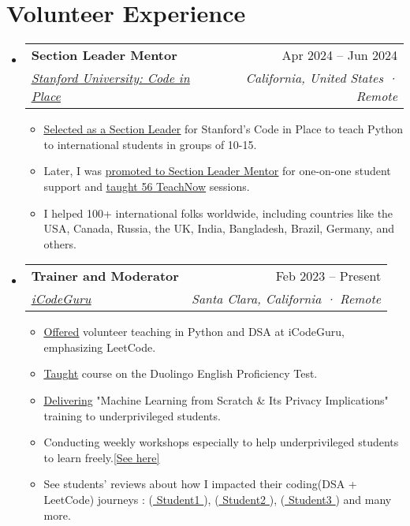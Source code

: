 \documentclass[letterpaper,11pt]{article}
\makeatletter
\newcommand{\resumeItem}[1]{
  \item\small{
    {#1 \vspace{-2pt}}
  }
}
\newcommand{\resumeSubheading}[4]{
  \vspace{-2pt}\item
    \begin{tabular*}{0.97\textwidth}[t]{l@{\extracolsep{\fill}}r}
      \textbf{#1} & #2 \\
      \textit{\small#3} & \textit{\small #4} \\
    \end{tabular*}\vspace{-7pt}
}
\newcommand{\resumeSubHeadingListStart}{\begin{itemize}[leftmargin=0.15in, label={}]}
\newcommand{\resumeSubHeadingListEnd}{\end{itemize}}
\newcommand{\resumeItemListStart}{\begin{itemize}}
\newcommand{\resumeItemListEnd}{\end{itemize}\vspace{-5pt}}
\makeatother
\begin{document}
\section{\textbf{Volunteer Experience}}
\resumeSubHeadingListStart
\resumeSubheading
{Section Leader Mentor}{Apr 2024 -- Jun 2024}
{{\href{https://codeinplace.stanford.edu/}{\underline{Stanford University: Code in Place}}}}{California, United States · Remote}
\resumeItemListStart
\resumeItem{{\href{https://www.linkedin.com/feed/update/urn:li:activity:7186385467846639620/}{\underline{Selected as a Section Leader}}} for Stanford's Code in Place to teach Python to international students in groups of 10-15.}
\resumeItem{Later, I was {\href{https://www.linkedin.com/posts/ahmad-jajja_stanfordabrcodeabrinabrplaceabrlearnings-activity-7195142429073633281-zNhV?utm_source=share&utm_medium=member_desktop}{\underline{promoted to Section Leader Mentor}}} for one-on-one student support and {\href{https://www.linkedin.com/feed/update/urn:li:activity:7204425552311541760/}{\underline{taught 56 TeachNow}}} sessions.}
\resumeItem{ I helped 100+ international folks worldwide, including countries like the USA, Canada, Russia, the UK, India, Bangladesh, Brazil, Germany, and others.}
\resumeItemListEnd
\resumeSubheading
{Trainer and Moderator}{Feb 2023 -- Present}
{{\href{https://www.linkedin.com/company/icode-guru/mycompany/}{\underline{iCodeGuru}}}}{Santa Clara, California · Remote}
\resumeItemListStart
\resumeItem{{\href{https://github.com/Ahmadjajja/LeetCode_Volunteer_Teaching}{\underline{Offered}}} volunteer teaching in Python and DSA at iCodeGuru, emphasizing LeetCode.}
\resumeItem{{\href{https://www.linkedin.com/feed/update/urn:li:activity:7169346246216671232/}{\underline{Taught}}} course on the Duolingo English Proficiency Test.}
\resumeItem{{\href{https://github.com/Ahmadjajja/Machine-Learning_and_its-privacy-implications}{\underline{Delivering}}} "Machine Learning from Scratch \& Its Privacy Implications" training to underprivileged students.}
\resumeItem{Conducting weekly workshops especially to help underprivileged students to learn freely.{\href{https://github.com/Ahmadjajja/LeetCode_Volunteer_Teaching}{\underline{[See here]}}}}
\resumeItem{See students' reviews about how I impacted their coding(DSA + LeetCode) journeys : ({\href{https://www.linkedin.com/posts/sikander-nawaz_dsa-dsa-leetcode-activity-7170805639886106624-Kxka?utm_source=share&utm_medium=member_desktop}{\underline{ Student1 }}}), ({\href{https://www.linkedin.com/posts/syedshahzilimran_mastering-trees-unlocking-the-key-of-dsa-activity-7174974045019398144-DN_C?utm_source=share&utm_medium=member_desktop}{\underline{ Student2 }}}), ({\href{https://www.linkedin.com/feed/update/urn:li:activity:7173635314391920640/}{\underline{ Student3 }}}) and many more. }
\resumeItemListEnd
\resumeSubHeadingListEnd
%
\end{document}

